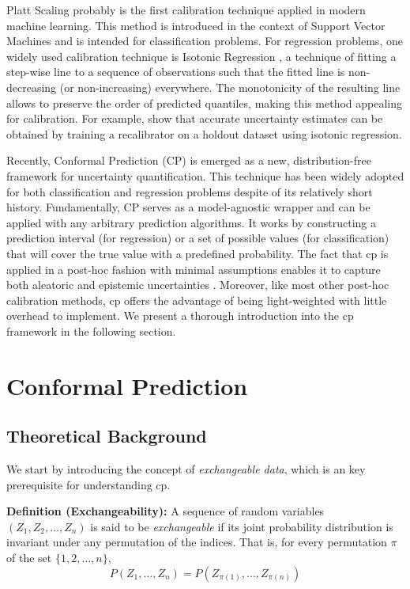 \documentclass[a4paper,oneside,bibliography=totoc]{scrbook}
\begin{document}
Platt Scaling \cite{platt1999probabilistic} probably is the first calibration technique applied in modern machine learning. This method is introduced in the context of Support Vector Machines and is intended for classification problems. For regression problems, one widely used calibration technique is Isotonic Regression \cite{niculescumizil2005predicting}, a technique of fitting a step-wise line to a sequence of observations such that the fitted line is non-decreasing (or non-increasing) everywhere. The monotonicity of the resulting line allows to preserve the order of predicted quantiles, making this method appealing for calibration. For example, \cite{pmlr-v80-kuleshov18a} show that accurate uncertainty estimates can be obtained by training a recalibrator on a holdout dataset using isotonic regression.

Recently, Conformal Prediction (CP) \cite{shafer2008tutorial, vovk2005algorithmic} is emerged as a new, distribution-free framework for uncertainty quantification. This technique has been widely adopted for both classification and regression problems despite of its relatively short history. Fundamentally, CP serves as a model-agnostic wrapper and can be applied with any arbitrary prediction algorithms. It works by constructing a prediction interval (for regression) or a set of possible values (for classification) that will cover the true value with a predefined probability. The fact that \gls{cp} is applied in a post-hoc fashion with minimal assumptions enables it to capture both aleatoric and epistemic uncertainties \cite{mossina2024CVPR}. Moreover, like most other post-hoc calibration methods, \gls{cp} offers the advantage of being light-weighted with little overhead to implement. We present a thorough introduction into the \gls{cp} framework in the following section.

\section{Conformal Prediction}
\label{sec: reviewCP}
\subsection{Theoretical Background}
We start by introducing the concept of \textit{exchangeable data}, which is an key prerequisite for understanding \gls{cp}.
\newline

\noindent
\textbf{Definition (Exchangeability):}  
A sequence of random variables \( (Z_1, Z_2, \dots, Z_n) \) is said to be \textit{exchangeable} if its joint probability distribution is invariant under any permutation of the indices. That is, for every permutation \( \pi \) of the set \( \{1, 2, \dots, n\} \),
\[
P(Z_1, \dots, Z_n) = P(Z_{\pi(1)}, \dots, Z_{\pi(n)})
\]
\end{document}
